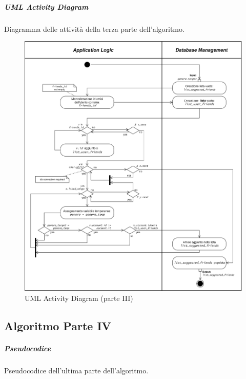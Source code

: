 \subparagraph{UML Activity Diagram}
Diagramma delle attività della terza parte dell'algoritmo.
\begin{figure} [H]
    \centering
    \includegraphics[scale=0.59]{images/flowchart_3_UML_ver2.png}
    \caption{UML Activity Diagram (parte III)}
    \label{fig-uml-ac-3}
\end{figure}



\newpage
\subsection{Algoritmo Parte IV}

\subparagraph{Pseudocodice}
Pseudocodice dell'ultima parte dell'algoritmo.  

